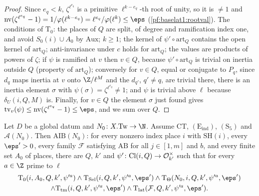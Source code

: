 \begin{proof}
Since $e_q<k$, $\zeta^{\ell^{e_q}}$ is a primitive $\ell^{k-e_q}$-th root of unity, so it is $\ne1$ and
$\baselatonenv(\zeta^{\ell^{e_q}}-1)=1/\varphi(\ell^{k-e_q})=\ell^{e_q}/\varphi(\ell^k)\le\eps$
(\cref{pf:baselat1:rootval}). The conditions of $\mathrm{T}_0$: the places of $Q$ are split, of degree and
ramification index one, and avoid $S_0(i)\cup A_0$ by $\mathrm{Aux}$; $k\ge1$; the kernel of
$\psi'\circ\mathrm{art}_Q$ contains the open kernel of $\mathrm{art}_Q$; anti-invariance under $c$ holds for
$\mathrm{art}_Q$; the values are products of powers of $\zeta$; if $\psi$ is ramified at $v$ then $v\in Q$, because
$\psi'\circ\mathrm{art}_Q$ is trivial on inertia outside $Q$ (property of $\mathrm{art}_Q$); conversely for $v\in Q$,
equal or conjugate to $P_q$, since $d_q$ maps inertia at $v$ onto $\Z/\ell^M$ and the $d_{q'}$, $q'\ne q$, are
trivial there, there is an inertia element $\sigma$ with $\psi(\sigma)=\zeta^{\ell^{e_q}}\ne1$; and $\psi$ is trivial
above $\ell$ because $\delta_U(i,Q,M)$ is. Finally, for $v\in Q$ the element $\sigma$ just found gives
$\mathrm{tv}_v(\psi)\le\baselatonenv(\zeta^{\ell^{e_q}}-1)\le\eps$, and we sum over $Q$.
\end{proof}

\begin{theorem}\label{pf:baselat1:choice}
Let $D$ be a global datum and $N_0\colon X.\mathrm{Tw}\to\N$. Assume $\mathrm{CT}$, $(\mathrm{E}_{\mathrm{ind}})$,
$(\mathrm{S}_5)$ and $\mathcal{A}(N_0)$. Then
$\mathrm{AIB}(N_0)$: for every nonzero index place $i$ with $\mathrm{SH}(i)$, every
$\eps'>0$, every family $\mathcal F$ satisfying $\mathrm{AB}$ for all $j\in[1,m]$ and $b$, and every finite set $A_0$
of places, there are $Q$, $k'$ and $\psi'\colon\mathrm{Cl}(i,Q)\to\mathcal O_{k'}^\times$ such that for every
$a\in\Z$ prime to $\ell$
\begin{multline*}
\mathrm{T}_0(i,A_0,Q,k',\psi'^a)\wedge\mathrm{T}_{\mathrm{Sel}}(i,Q,k',\psi'^a,\eps')\wedge\mathrm{T}_{\Theta}(N_0,i,Q,k',\psi'^a,\eps')\\
\wedge\mathrm{T}_{\mathrm{tm}}(i,Q,k',\psi'^a,\eps')\wedge\mathrm{T}_{\mathrm{lat}}(\mathcal F,Q,k',\psi'^a,\eps').
\end{multline*}
\end{theorem}

